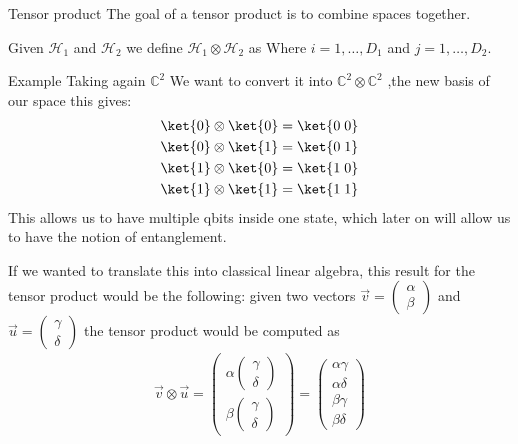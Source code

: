\begin{parag}{Tensor product}
	The goal of a tensor product is to combine spaces together. 
	\begin{definition}
    Given $\mathcal{H}_1$ and $\mathcal{H}_2$ we define $\mathcal{H}_1 \otimes \mathcal{H}_2$ as
	Where $i =  1, \ldots, D_1$ and $j = 1, \ldots, D_2$.
	\end{definition}
	\begin{subparag}{Example}
	    Taking again $\mathbb{C}^2$ We  want to convert it into $\mathbb{C}^2 \otimes \mathbb{C}^2$ ,the new basis of our space this gives:
		\begin{align*} 
			\ket{0} \otimes \ket{0} = \ket{ 0\; 0}\\
			\ket{0} \otimes \ket{1} = \ket{ 0\; 1}\\
			\ket{1} \otimes \ket{0} = \ket{ 1\; 0}\\
			\ket{1} \otimes \ket{1} = \ket{ 1\; 1}\\
		\end{align*}
		This allows us to have multiple qbits inside one state, which later on will allow us to have the notion of entanglement.
	\end{subparag}
	If we wanted to translate this into classical linear algebra, this result for the tensor product would be the following: given two vectors $\vec{v} =  \begin{pmatrix} \alpha \\ \beta \end{pmatrix} $ and $\vec{u} =  \begin{pmatrix} \gamma \\ \delta \end{pmatrix}$ the tensor product would be computed as 
	\begin{align*} 
		\vec{v} \otimes \vec{u} = \begin{pmatrix} \alpha\begin{pmatrix} \gamma \\\delta  \end{pmatrix}  \\ \beta \begin{pmatrix} \gamma \\\delta  \end{pmatrix}  \end{pmatrix} =  \begin{pmatrix} \alpha \gamma \\ \alpha \delta \\ \beta \gamma \\ \beta \delta \end{pmatrix} 

\end{align*}
\end{parag}
